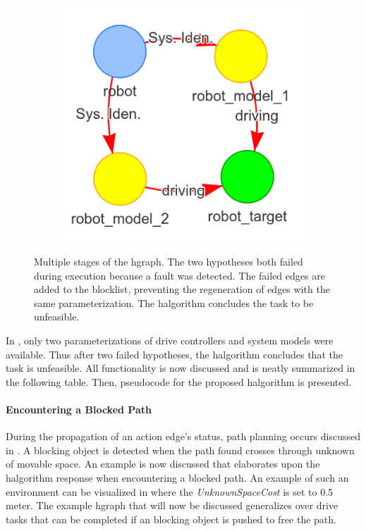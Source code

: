 \begin{figure}[H]
\begin{subfigure}{.3\textwidth}
    \end{subfigure}
    \begin{subfigure}{.3\textwidth}
    \centering
    \includegraphics[width=1\textwidth]{figures/proposed_method/connecting_nodes/failure/fail_7}
    \end{subfigure}
    \hfill
    \caption{Multiple stages of the \ac{hgraph}. The two hypotheses both failed during execution because a fault was detected. The failed edges are added to the blocklist, preventing the regeneration of edges with the same parameterization. The \ac{halgorithm} concludes the task to be unfeasible.}%
    \label{fig:failure_in_hgraph}
\end{figure}

In , only two parameterizations of drive controllers and system models were available. Thus after two failed hypotheses, the \ac{halgorithm} concludes that the task is unfeasible. All functionality is now discussed and is neatly summarized in the following table. Then, pseudocode for the proposed \ac{halgorithm} is presented.\bs

\paragraph{Encountering a Blocked Path}%
During the propagation of an action edge's status, path planning occurs discussed in . A blocking object is detected when the path found crosses through unknown of movable space. An example is now discussed that elaborates upon the \ac{halgorithm} response when encountering a blocked path. An example of such an environment can be visualized in  where the \textit{UnknownSpaceCost} is set to 0.5 meter. The example \ac{hgraph} that will now be discussed generalizes over drive tasks that can be completed if an blocking object is pushed to free the path.\bs

